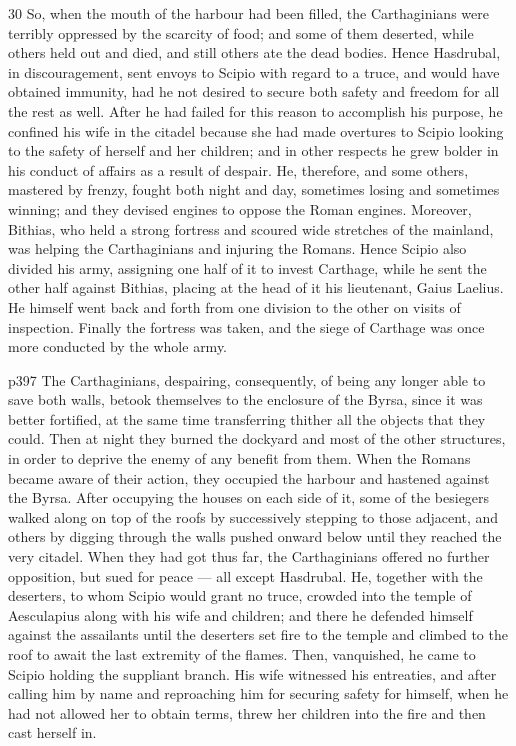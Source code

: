 30
So, when the mouth of the harbour had been filled, the Carthaginians were terribly oppressed by the scarcity of food; and some of them deserted, while others held out and died, and still others ate the dead bodies. Hence Hasdrubal, in discouragement, sent envoys to Scipio with regard to a truce, and would have obtained immunity, had he not desired to secure both safety and freedom for all the rest as well. After he had failed for this reason to accomplish his purpose, he confined his wife in the citadel because she had made overtures to Scipio looking to the safety of herself and her children; and in other respects he grew bolder in his conduct of affairs as a result of despair. He, therefore, and some others, mastered by frenzy, fought both night and day, sometimes losing and sometimes winning; and they devised engines to oppose the Roman engines. Moreover, Bithias, who held a strong fortress and scoured wide stretches of the mainland, was helping the Carthaginians and injuring the Romans. Hence Scipio also divided his army, assigning one half of it to invest Carthage, while he sent the other half against Bithias, pla­cing at the head of it his lieutenant, Gaius Laelius. He himself went back and forth from one division to the other on visits of inspection. Finally the fortress was taken, and the siege of Carthage was once more conducted by the whole army.

p397
The Carthaginians, despairing, consequently, of being any longer able to save both walls, betook themselves to the enclosure of the Byrsa, since it was better fortified, at the same time transferring thither all the objects that they could. Then at night they burned the dockyard and most of the other structures, in order to deprive the enemy of any benefit from them. When the Romans became aware of their action, they occupied the harbour and hastened against the Byrsa. After occupying the houses on each side of it, some of the besiegers walked along on top of the roofs by successively stepping to those adjacent, and others by digging through the walls pushed onward below until they reached the very citadel. When they had got thus far, the Carthaginians offered no further opposition, but sued for peace \texthebrew{—} all except Hasdrubal. He, together with the deserters, to whom Scipio would grant no truce, crowded into the temple of Aesculapius along with his wife and children; and there he defended himself against the assailants until the deserters set fire to the temple and climbed to the roof to await the last extremity of the flames. Then, vanquished, he came to Scipio holding the suppliant branch. His wife witnessed his entreaties, and after calling him by name and reproaching him for securing safety for himself, when he had not allowed her to obtain terms, threw her children into the fire and then cast herself in.

